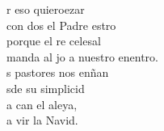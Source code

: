 \begin{cancion}
	\begin{chorus}%
	r eso quieroezar\\
	con dos el Padre estro\\
	porque el re celesal\\
	manda al jo a nuestro enentro.\\
	s pastores nos enñan\\
	sde su simplicid\\
	a can el aleya,\\
	a vir la Navid.\\
	\end{chorus}%
	\jump\\
\end{cancion}%
